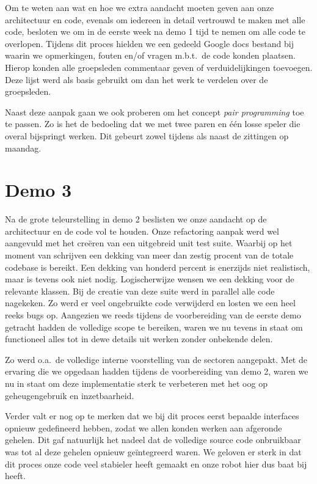 \documentclass[12pt,a4paper]{report}
\begin{document}
Om te weten aan wat en hoe we extra aandacht moeten geven aan onze architectuur en code, evenals om iedereen in detail vertrouwd te maken met alle code, besloten we om in de eerste week na demo 1 tijd te nemen om alle code te overlopen. Tijdens dit proces hielden we een gedeeld Google docs bestand bij waarin we opmerkingen, fouten en/of vragen m.b.t.\ de code konden plaatsen. Hierop konden alle groepsleden commentaar geven of verduidelijkingen toevoegen. Deze lijst werd als basis gebruikt om dan het werk te verdelen over de groepsleden.

Naast deze aanpak gaan we ook proberen om het concept \emph{pair programming} toe te passen. Zo is het de bedoeling dat we met twee paren en \'e\'en losse speler die overal bijspringt werken. Dit gebeurt zowel tijdens als naast de zittingen op maandag.

\section{Demo 3}

Na de grote teleurstelling in demo 2 beslisten we onze aandacht op de architectuur en de code vol te houden. Onze refactoring aanpak werd wel aangevuld met het cre\"eren van een uitgebreid unit test suite. Waarbij op het moment van schrijven een dekking van meer dan zestig procent van de totale codebase is bereikt. Een dekking van honderd percent is enerzijds niet realistisch, maar is tevens ook niet nodig. Logischerwijze wensen we een dekking voor de relevante klassen. Bij de creatie van deze suite werd in parallel alle code nagekeken. Zo werd er veel ongebruikte code verwijderd en losten we een heel reeks bugs op. Aangezien we reeds tijdens de voorbereiding van de eerste demo getracht hadden de volledige scope te bereiken, waren we nu tevens in staat om functioneel alles tot in dewe  details uit werken zonder onbekende delen.

Zo werd o.a.\ de volledige interne voorstelling van de sectoren aangepakt. Met de ervaring die we opgedaan hadden tijdens de voorbereiding van demo 2, waren we nu in staat om deze implementatie sterk te verbeteren met het oog op geheugengebruik en inzetbaarheid.

Verder valt er nog op te merken dat we bij dit proces eerst bepaalde interfaces opnieuw gedefineerd hebben, zodat we allen konden werken aan afgeronde gehelen. Dit gaf natuurlijk het nadeel dat de volledige source code onbruikbaar was tot al deze gehelen opnieuw ge\"integreerd waren. We geloven er sterk in dat dit proces onze code veel stabieler heeft gemaakt en onze robot hier dus baat bij heeft.
\end{document}
